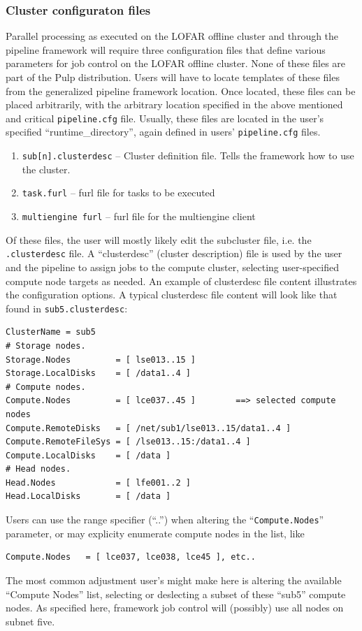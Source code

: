 \documentclass[a4paper,10pt,bibtotoc]{scrartcl}
\begin{document}
\subsubsection{Cluster configuraton files}
Parallel processing as executed on the LOFAR offline cluster and through the pipeline framework will require three configuration files that define various parameters for job control on the LOFAR offline cluster.  None of these files are part of the Pulp distribution.  Users will have to locate templates of these files from the generalized pipeline framework location.  Once located, these files can be placed arbitrarily, with the arbitrary location specified in the above mentioned and critical \verb|pipeline.cfg| file.  Usually, these files are located in the user's specified ``runtime\_directory'', again defined in users' \verb|pipeline.cfg| files.
\begin{enumerate}
\item \verb|sub[n].clusterdesc| -- Cluster definition file.  Tells the framework how to use the cluster.
\item \verb|task.furl| -- furl file for tasks to be executed
\item \verb|multiengine furl| -- furl file for the multiengine client
\end{enumerate}
Of these files, the user will mostly likely edit the subcluster file, i.e. the \verb|.clusterdesc| file.  A ``clusterdesc'' (cluster description) file is used by the user and the pipeline to assign jobs to the compute cluster, selecting user-specified compute node targets as needed.  An example of clusterdesc file content illustrates the configuration options.  A typical clusterdesc file content will look like that found in \verb|sub5.clusterdesc|:
\begin{verbatim}
ClusterName = sub5 
# Storage nodes. 
Storage.Nodes         = [ lse013..15 ] 
Storage.LocalDisks    = [ /data1..4 ] 
# Compute nodes. 
Compute.Nodes         = [ lce037..45 ]        ==> selected compute nodes
Compute.RemoteDisks   = [ /net/sub1/lse013..15/data1..4 ] 
Compute.RemoteFileSys = [ /lse013..15:/data1..4 ] 
Compute.LocalDisks    = [ /data ] 
# Head nodes. 
Head.Nodes            = [ lfe001..2 ] 
Head.LocalDisks       = [ /data ]
\end{verbatim}
Users can use the range specifier (``..'') when altering the ``\verb|Compute.Nodes|'' parameter, or may explicity enumerate compute nodes in the list, like
 \begin{verbatim}
Compute.Nodes   = [ lce037, lce038, lce45 ], etc..
\end{verbatim}
The most common adjustment user's might make here is altering the available ``Compute Nodes'' list, selecting or deslecting a subset of these ``sub5'' compute nodes.  As specified here, framework job control will (possibly) use all nodes on subnet five.
\end{document}
